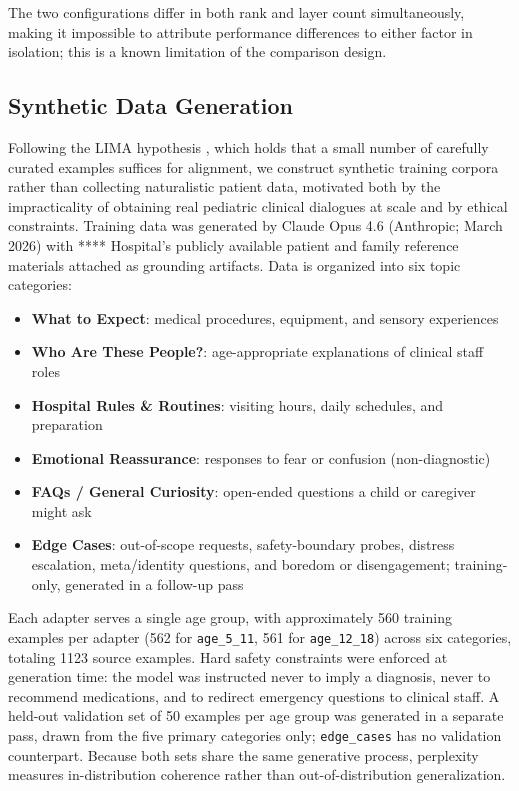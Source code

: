 \documentclass[ASNA,twocolumn]{USG} %
\begin{document}
The two configurations differ in both rank and layer count simultaneously, making it impossible to attribute performance differences to either factor in isolation; this is a known limitation of the comparison design.

\subsection{Synthetic Data Generation}

Following the LIMA hypothesis \cite{zhou2023lima}, which holds that a small number of carefully curated examples suffices for alignment, we construct synthetic training corpora rather than collecting naturalistic patient data, motivated both by the impracticality of obtaining real pediatric clinical dialogues at scale and by ethical constraints. Training data was generated by Claude Opus 4.6 (Anthropic; March 2026) with **** Hospital's publicly available patient and family reference materials attached as grounding artifacts. Data is organized into six topic categories:

\begin{itemize}
    \item \textbf{What to Expect}: medical procedures, equipment, and sensory experiences
    \item \textbf{Who Are These People?}: age-appropriate explanations of clinical staff roles
    \item \textbf{Hospital Rules \& Routines}: visiting hours, daily schedules, and preparation
    \item \textbf{Emotional Reassurance}: responses to fear or confusion (non-diagnostic)
    \item \textbf{FAQs / General Curiosity}: open-ended questions a child or caregiver might ask
    \item \textbf{Edge Cases}: out-of-scope requests, safety-boundary probes, distress escalation, meta/identity questions, and boredom or disengagement; training-only, generated in a follow-up pass
\end{itemize}

Each adapter serves a single age group, with approximately 560 training examples per adapter (562 for \texttt{age\_5\_11}, 561 for \texttt{age\_12\_18}) across six categories, totaling 1123 source examples. Hard safety constraints were enforced at generation time: the model was instructed never to imply a diagnosis, never to recommend medications, and to redirect emergency questions to clinical staff. A held-out validation set of 50 examples per age group was generated in a separate pass, drawn from the five primary categories only; \texttt{edge\_cases} has no validation counterpart. Because both sets share the same generative process, perplexity measures in-distribution coherence rather than out-of-distribution generalization.
\end{document}

